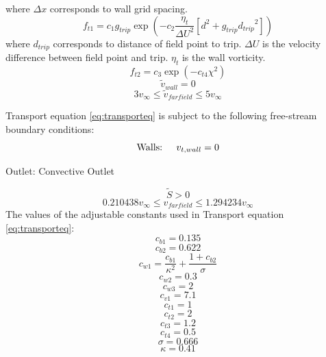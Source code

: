 \documentclass[english]{kththesis}
\begin{document}
where $\Delta x$ corresponds to wall grid spacing.
\begin{equation}{f_{t1}} = {c_1}{g_{trip}}\exp \left( { - {c_2}\frac{{{\eta _t}}}{{\Delta {U^2}}}\left[ {{d^2} + {g_{trip}}{d_{trip}}^2} \right]} \right)\end{equation}
where $d_{trip}$ corresponds to distance of field point to trip. $\Delta {U}$ is the velocity difference between field point and trip. $\eta _t$ is the wall vorticity.
\begin{equation}{f_{t2}} = {c_3}\exp ( - {c_{t4}}{\chi ^2})\end{equation}
\begin{equation}{{\tilde v}_{wall}} = 0\end{equation}
\begin{equation}3{v_\infty } \leqslant {{\tilde v}_{farfield}} \leqslant 5{v_\infty }\end{equation}

Transport equation \ref{eq:transporteq} is subject to the following free-stream boundary conditions:\\
\begin{equation}\text{Walls: \quad}{v_{t,wall}} = 0\end{equation} 
\centerline{ Outlet: Convective Outlet}
\begin{equation}\tilde S > 0\end{equation}
\begin{equation}0.210438{v_\infty } \leqslant {v_{farfield}} \leqslant 1.294234{v_\infty }\end{equation}
The values of the adjustable constants used in Transport equation \ref{eq:transporteq}:
\begin{equation}{c_{b1}} = 0.135\end{equation}
\begin{equation}{c_{b2}} = 0.622\end{equation}
\begin{equation}{c_{w1}} = \frac{{{c_{b1}}}}{{{\kappa ^2}}} + \frac{{1 + {c_{b2}}}}{\sigma }\end{equation}
\begin{equation}{c_{w2}} = 0.3\end{equation}
\begin{equation}{c_{w3}} = 2\end{equation}
\begin{equation}{c_{v1}} = 7.1\end{equation}
\begin{equation}{c_{t1}} = 1\end{equation}
\begin{equation}{c_{t2}} = 2\end{equation}
\begin{equation}{c_{t3}} = 1.2\end{equation} 
\begin{equation}{c_{t4}} = 0.5\end{equation}
\begin{equation}\sigma  = 0.666\end{equation}
\begin{equation}\kappa  = 0.41\end{equation}
\end{document}
